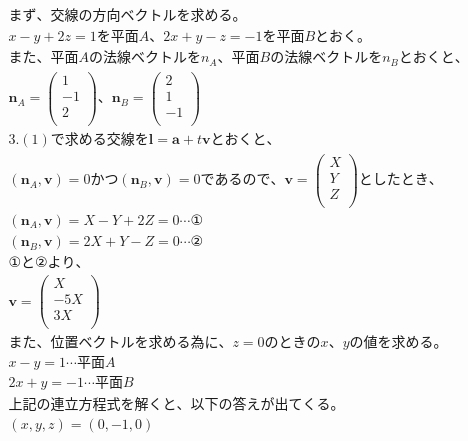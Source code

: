 \documentclass[dvipdfmx,uplatex]{jsarticle}
\begin{document}
  \begin{equation}
    \begin{aligned}
        &まず、交線の方向ベクトルを求める。\nonumber\\
        &x-y+2z=1を平面A、2x+y-z=-1を平面Bとおく。\nonumber\\
        &また、平面Aの法線ベクトルを{n}_{A}、平面Bの法線ベクトルを{n}_{B}とおくと、\nonumber\\
        &\bm{n}_{A}= \begin{pmatrix} 1\\ -1\\ 2\\ \end{pmatrix}、\bm{n}_{B} = \begin{pmatrix} 2\\ 1\\ -1\\ \end{pmatrix} \nonumber\\
        &3.(1)で求める交線を\bm{l}=\bm{a} + t\bm{v}とおくと、 \nonumber\\
        &(\bm{n}_{A}, \bm{v})=0かつ(\bm{n}_{B}, \bm{v})=0であるので、\bm{v} = \begin{pmatrix} X\\ Y\\ Z\\ \end{pmatrix}としたとき、\nonumber\\
        &(\bm{n}_{A}, \bm{v})=X-Y+2Z=0 \cdots① \nonumber\\
        &(\bm{n}_{B}, \bm{v})=2X+Y-Z=0 \cdots② \nonumber\\
        &①と②より、\nonumber\\
        &\bm{v}=\begin{pmatrix} X\\ -5X\\ 3X\\ \end{pmatrix}\nonumber\\
        &また、位置ベクトルを求める為に、z=0のときのx、yの値を求める。\nonumber\\
        &x-y=1 \cdots 平面A \nonumber\\
        &2x+y=-1 \cdots 平面B \nonumber\\
        &上記の連立方程式を解くと、以下の答えが出てくる。\nonumber\\
        &(x, y, z) = (0, -1, 0)\nonumber\\

\end{aligned}
\end{equation}
\end{document}
